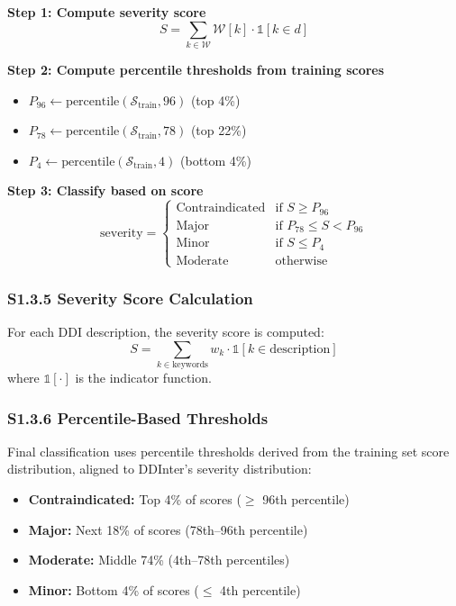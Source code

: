 \documentclass[11pt,a4paper]{article}
\begin{document}
\textbf{Step 1: Compute severity score}
\begin{equation}
S = \sum_{k \in \mathcal{W}} \mathcal{W}[k] \cdot \mathbb{1}[k \in d]
\end{equation}

\textbf{Step 2: Compute percentile thresholds from training scores}
\begin{itemize}
\item $P_{96} \gets \text{percentile}(\mathcal{S}_{\text{train}}, 96)$ (top 4\%)
\item $P_{78} \gets \text{percentile}(\mathcal{S}_{\text{train}}, 78)$ (top 22\%)
\item $P_{4} \gets \text{percentile}(\mathcal{S}_{\text{train}}, 4)$ (bottom 4\%)
\end{itemize}

\textbf{Step 3: Classify based on score}
\begin{equation}
\text{severity} = 
\begin{cases}
\text{Contraindicated} & \text{if } S \geq P_{96} \\
\text{Major} & \text{if } P_{78} \leq S < P_{96} \\
\text{Minor} & \text{if } S \leq P_{4} \\
\text{Moderate} & \text{otherwise}
\end{cases}
\end{equation}

\subsubsection{S1.3.5 Severity Score Calculation}

For each DDI description, the severity score is computed:
\begin{equation}
S = \sum_{k \in \text{keywords}} w_k \cdot \mathbb{1}[k \in \text{description}]
\end{equation}
where $\mathbb{1}[\cdot]$ is the indicator function.

\subsubsection{S1.3.6 Percentile-Based Thresholds}

Final classification uses percentile thresholds derived from the training set score distribution, aligned to DDInter's severity distribution:

\begin{itemize}
\item \textbf{Contraindicated:} Top 4\% of scores ($\geq$ 96th percentile)
\item \textbf{Major:} Next 18\% of scores (78th--96th percentile)
\item \textbf{Moderate:} Middle 74\% (4th--78th percentiles)
\item \textbf{Minor:} Bottom 4\% of scores ($\leq$ 4th percentile)
\end{itemize}
\end{document}

